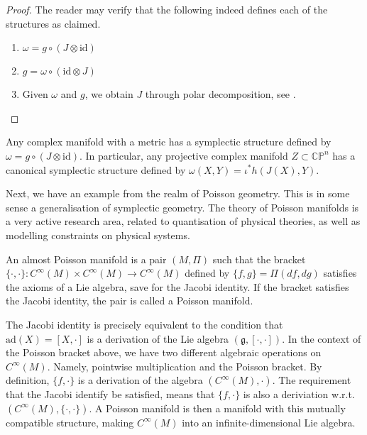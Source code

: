 \begin{proof}
  The reader may verify that the following indeed defines each of the structures as claimed.
  \begin{enumerate}
    \item $\omega=g\circ (J\otimes\text{id})$
    \item $g=\omega\circ(\text{id}\otimes J)$
    \item Given $\omega$ and $g$, we obtain $J$ through polar decomposition, see \cite{book:cds}.
  \end{enumerate}
\end{proof}
\begin{corollary}
  Any complex manifold with a metric has a symplectic structure defined by $\omega=g\circ (J\otimes\text{id})$. In particular, any projective complex manifold $Z\subset\mathbb{CP}^n$ has a canonical symplectic structure defined by $\omega(X,Y)=\iota^*h(J(X),Y)$.
\end{corollary}
Next, we have an example from the realm of Poisson geometry. This is in some sense a generalisation of symplectic geometry. The theory of Poisson manifolds is a very active research area, related to quantisation of physical theories, as well as modelling constraints on physical systems.
\begin{definition}
  An almost Poisson manifold is a pair $(M,\Pi)$ such that the bracket $\{\cdot,\cdot\}:C^\infty(M)\times C^\infty(M)\to C^\infty(M)$ defined by $\{f,g\}=\Pi(df,dg)$ satisfies the axioms of a Lie algebra, save for the Jacobi identity. If the bracket satisfies the Jacobi identity, the pair is called a Poisson manifold.
\end{definition}
\begin{remark}
  The Jacobi identity is precisely equivalent to the condition that $\text{ad}(X)=[X,\cdot]$ is a derivation of the Lie algebra $(\mathfrak{g},[\cdot,\cdot])$. In the context of the Poisson bracket above, we have two different algebraic operations on $C^\infty(M)$. Namely, pointwise multiplication and the Poisson bracket. By definition, $\{f,\cdot\}$ is a derivation of the algebra $(C^\infty(M),\cdot)$. The requirement that the Jacobi identify be satisfied, means that $\{f,\cdot\}$ is also a deriviation w.r.t. $(C^\infty(M),\{\cdot,\cdot\})$. A Poisson manifold is then a manifold with this mutually compatible structure, making $C^\infty(M)$ into an infinite-dimensional Lie algebra.
\end{remark}
